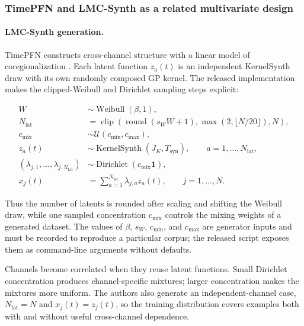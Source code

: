 \subsubsection{TimePFN and LMC-Synth as a related multivariate design}

\paragraph{LMC-Synth generation.}
TimePFN constructs cross-channel structure with a linear model of
coregionalization \citep{taga2025timepfn}. Each latent function $z_a(t)$ is an
independent KernelSynth draw with its own randomly composed GP kernel. The
released implementation makes the clipped-Weibull and Dirichlet sampling
steps explicit:

\begin{equation}
\begin{aligned}
W&\sim\operatorname{Weibull}(\beta,1),\\
N_{\mathrm{lat}}
    &=\operatorname{clip}\!\left(
      \operatorname{round}(s_W W+1),
      \max(2,\lfloor N/20\rfloor),N\right),\\
c_{\mathrm{mix}}&\sim\mathcal U(c_{\min},c_{\max}),\\
z_a(t)&\sim\operatorname{KernelSynth}(J_K,T_{\mathrm{syn}}),
      \qquad a=1,\ldots,N_{\mathrm{lat}},\\
(\lambda_{j,1},\ldots,\lambda_{j,N_{\mathrm{lat}}})
    &\sim\operatorname{Dirichlet}(c_{\mathrm{mix}}\mathbf 1),\\
x_j(t)&=\sum_{a=1}^{N_{\mathrm{lat}}}\lambda_{j,a}z_a(t),
      \qquad j=1,\ldots,N.
\end{aligned}
\label{eq:lmc-synth}
\end{equation}

Thus the number of latents is rounded after scaling and shifting the Weibull
draw, while one sampled concentration $c_{\mathrm{mix}}$ controls the mixing
weights of a generated dataset. The values of $\beta$, $s_W$, $c_{\min}$, and $c_{\max}$
are generator inputs and must be recorded to reproduce a particular corpus;
the released script exposes them as command-line arguments without defaults.

Channels become correlated when they reuse latent functions. Small Dirichlet
concentration produces channel-specific mixtures; larger concentration makes
the mixtures more uniform. The authors also generate an independent-channel
case, $N_{\mathrm{lat}}=N$ and $x_j(t)=z_j(t)$, so the training distribution
covers examples both with and without useful cross-channel dependence.

